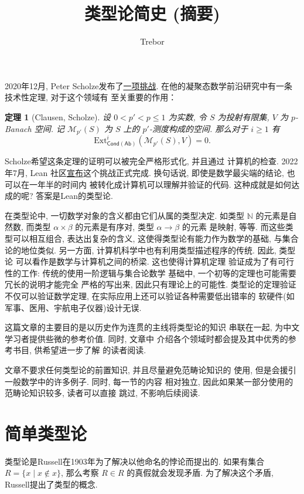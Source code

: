 \documentclass[UTF8, zihao=-4]{ctexart}
\title{类型论简史 (摘要)}
\date{}
\author{Trebor}
\theoremstyle{plain}
\newtheorem*{theorem}{定理}
\theoremstyle{definition}
\theoremstyle{remark}
\begin{document}
\maketitle

2020年12月, Peter Scholze发布了\href{https://xenaproject.wordpress.com/2020/12/05/liquid-tensor-experiment/}{一项挑战}.
在他的凝聚态数学前沿研究中有一条技术性定理, 对于这个领域有
至关重要的作用：
\begin{theorem}[Clausen, Scholze]
设 \(0 < p' < p \le 1\) 为实数, 令 \(S\) 为投射有限集,
\(V\) 为 \(p\)-Banach 空间. 记 \(\mathcal M_{p'}(S)\)
为 \(S\) 上的 \(p'\)-测度构成的空间. 那么对于 \(i \ge 1\) 有
\[\mathrm{Ext}_{\mathsf{Cond}(\mathsf{Ab})}^i(
  \mathcal M_{p'}(S), V
) = 0.\]
\end{theorem}
Scholze希望这条定理的证明可以被完全严格形式化, 并且通过
计算机的检查. 2022年7月, Lean
社区\href{https://leanprover-community.github.io/blog/posts/lte-final/}{宣布}这个挑战正式完成.
换句话说, 即使是数学最尖端的结论, 也可以在一年半的时间内
被转化成计算机可以理解并验证的代码.
这种成就是如何达成的呢? 答案是Lean的类型论.

在类型论中, 一切数学对象的含义都由它们从属的类型决定.
如类型 \(\mathbb N\) 的元素是自然数, 而类型 \(\alpha \times \beta\)
的元素是有序对, 类型 \(\alpha \to\beta\) 的元素
是映射, 等等. 而这些类型可以相互组合, 表达出复杂的含义,
这使得类型论有能力作为数学的基础, 与集合论的地位类似.
另一方面, 计算机科学中也有利用类型描述程序的传统. 因此, 类型论
可以看作是数学与计算机之间的桥梁. 这也使得计算机定理
验证成为了有可行性的工作: 传统的使用一阶逻辑与集合论数学
基础中, 一个初等的定理也可能需要冗长的说明才能完全
严格的写出来, 因此只有理论上的可能性.
类型论的定理验证不仅可以验证数学定理,
在实际应用上还可以验证各种需要低出错率的
软硬件(如军事、医用、宇航电子仪器)设计无误.


这篇文章的主要目的是以历史作为连贯的主线将类型论的知识
串联在一起, 为中文学习者提供些微的参考价值. 同时, 文章中
介绍各个领域时都会提及其中优秀的参考书目, 供希望进一步了解
的读者阅读.

文章不要求任何类型论的前置知识, 并且尽量避免范畴论知识的
使用, 但是会援引一般数学中的许多例子. 同时, 每一节的内容
相对独立, 因此如果某一部分使用的范畴论知识较多, 读者可以直接
跳过, 不影响后续阅读.

\section*{简单类型论}
类型论是Russell在1903年为了解决以他命名的悖论而提出的.
如果有集合 \(R = \{x \mid x \notin x\}\), 那么考察
\(R \in R\) 的真假就会发现矛盾. 为了解决这个矛盾,
Russell提出了类型的概念.
\end{document}

